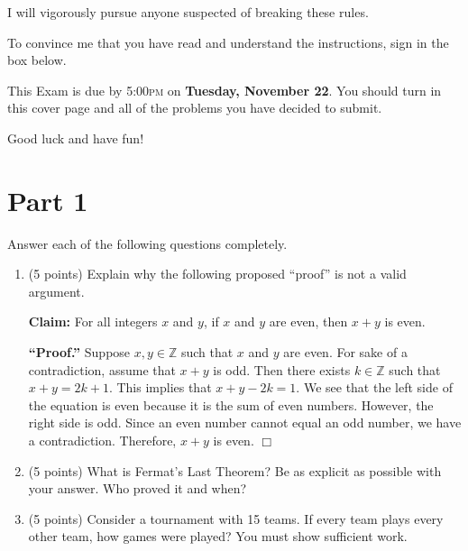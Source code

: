 \documentclass[11pt]{article}
\theoremstyle{definition}
\begin{document}
I will vigorously pursue anyone suspected of breaking these rules. 

\bigskip

To convince me that you have read and understand the instructions, sign in the box below.

\bigskip

\setlength{\fboxsep}{10pt}


\bigskip

This Exam is due by 5:00\textsc{pm} on \textbf{Tuesday, November 22}.  You should turn in this cover page and all of the problems you have decided to submit.

\bigskip

Good luck and have fun!

\newpage

\section*{Part 1}

Answer each of the following questions completely.

\begin{enumerate}

\item (5 points)  Explain why the following proposed ``proof'' is not a valid argument.

\bigskip

\textbf{Claim:}  For all integers $x$ and $y$, if $x$ and $y$ are even, then $x+y$ is even.

\bigskip

\textbf{``Proof.''}  Suppose $x, y \in \mathbb{Z}$ such that $x$ and $y$ are even.  For sake of a contradiction, assume that $x+y$ is odd.  Then there exists $k \in \mathbb{Z}$ such that $x+y=2k+1$.  This implies that $x+y-2k=1$.  We see that the left side of the equation is even because it is the sum of even numbers.  However, the right side is odd.  Since an even number cannot equal an odd number, we have a contradiction.  Therefore, $x+y$ is even.  \hfill $\Box$

\item (5 points)  What is Fermat's Last Theorem?  Be as explicit as possible with your answer.  Who proved it and when?

\item (5 points)  Consider a tournament with 15 teams.  If every team plays every other team, how games were played?  You must show sufficient work.
\end{enumerate}
\end{document}
